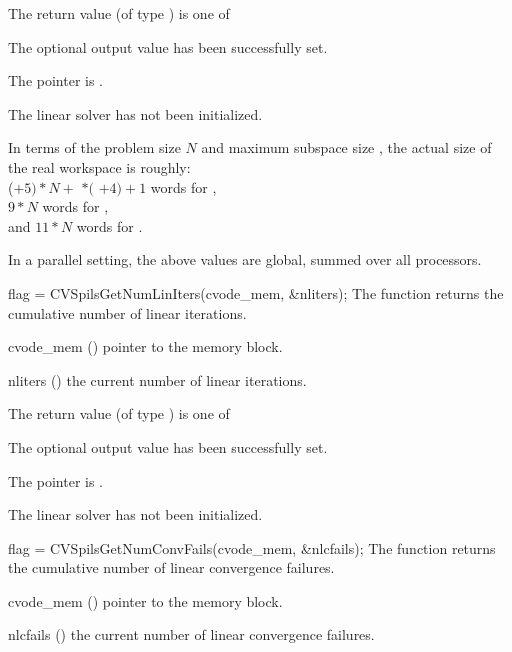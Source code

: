 {
  The return value  (of type ) is one of
  \begin{args}
  \item[\Id{CVSPILS\_SUCCESS}] 
    The optional output value has been successfully set.
  \item[\Id{CVSPILS\_MEM\_NULL}]
    The  pointer is .
  \item[\Id{CVSPILS\_LMEM\_NULL}]
    The {\cvspils} linear solver has not been initialized.
  \end{args}
}
{
  In terms of the problem size $N$ and maximum subspace size , 
  the actual size of the real workspace is roughly:\\
  ($+ 5)*N +$  $*($ $ + 4) + 1$ 
  words for {\cvspgmr},\\
  $9*N$  words for {\cvspbcg},\\
  and $11*N$  words for {\cvsptfqmr}.

  In a parallel setting, the above values are global, summed over all processors.
}
{
  flag = CVSpilsGetNumLinIters(cvode\_mem, \&nliters);
}
{
  The function  returns the
  cumulative number of linear iterations.
}
{
  \begin{args}
  \item[cvode\_mem] ()
    pointer to the {\cvodes} memory block.
  \item[nliters] ()
    the current number of linear iterations.
  \end{args}
}
{
  The return value  (of type ) is one of
  \begin{args}
  \item[\Id{CVSPILS\_SUCCESS}] 
    The optional output value has been successfully set.
  \item[\Id{CVSPILS\_MEM\_NULL}]
    The  pointer is .
  \item[\Id{CVSPILS\_LMEM\_NULL}]
    The {\cvspils} linear solver has not been initialized.
  \end{args}
}
{}
{
  flag = CVSpilsGetNumConvFails(cvode\_mem, \&nlcfails);
}
{
  The function  returns the
  cumulative number of linear convergence failures.
}
{
  \begin{args}
  \item[cvode\_mem] ()
    pointer to the {\cvodes} memory block.
  \item[nlcfails] ()
    the current number of linear convergence failures.
  \end{args}
}
